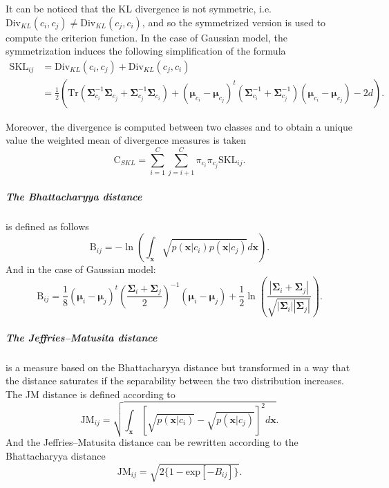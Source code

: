 \documentclass[a4paper,11pt,DIV=16,abstracton]{scrartcl}
\begin{document}
            It can be noticed that the KL divergence is not symmetric, i.e. $\text{Div}_{KL}(c_i,c_j) \ne \text{Div}_{KL}(c_j,c_i)$, and so the symmetrized version is used to compute the criterion function. In the case of Gaussian model, the symmetrization induces the following simplification of the formula
            \begin{align}
                \text{SKL}_{ij} &=\text{Div}_{KL}(c_i,c_j) + \text{Div}_{KL}(c_j,c_i) \nonumber \\
                &= \frac{1}{2} \left( \text{Tr} (\boldsymbol{\Sigma}_{c_i}^{-1} \boldsymbol{\Sigma}_{c_j} + \boldsymbol{\Sigma}_{c_j}^{-1} \boldsymbol{\Sigma}_{c_i}) + (\boldsymbol{\mu}_{c_i} - \boldsymbol{\mu}_{c_j})^t (\boldsymbol{\Sigma}_{c_i}^{-1} + \boldsymbol{\Sigma}_{c_j}^{-1}) (\boldsymbol{\mu}_{c_i} - \boldsymbol{\mu}_{c_j}) - 2d \right).
            \end{align}

            Moreover, the divergence is computed between two classes and to obtain a unique value the weighted mean of divergence measures is taken
            \begin{equation}
                \text{C}_{SKL} = \sum_{i=1}^{C} \sum_{j=i + 1}^{C} \pi_{c_i} \pi_{c_j} \text{SKL}_{ij}.
            \end{equation}

            \subparagraph{The Bhattacharyya distance} is defined as follows
            \begin{equation}
                \text{B}_{ij} = - \ln \left( \int_\mathbf{x} \sqrt{p(\mathbf{x}|c_i) p(\mathbf{x}|c_j)} d\mathbf{x} \right).
            \end{equation}
            And in the case of Gaussian model:
            \begin{equation}
                \text{B}_{ij} = \frac{1}{8} (\boldsymbol{\mu}_i - \boldsymbol{\mu}_j)^t \left( \frac{\boldsymbol{\Sigma}_i + \boldsymbol{\Sigma}_j}{2} \right)^{-1} (\boldsymbol{\mu}_i - \boldsymbol{\mu}_j) + \frac{1}{2} \ln \left( \frac{|\boldsymbol{\Sigma}_i + \boldsymbol{\Sigma}_j|}{\sqrt{|\boldsymbol{\Sigma}_i| |\boldsymbol{\Sigma}_j|}} \right).
            \end{equation}

            \subparagraph{The Jeffries–Matusita distance} is a measure based on the Bhattacharyya distance but transformed in a way that the distance saturates if the separability between the two distribution increases. The JM distance is defined according to
            \begin{equation}
                \text{JM}_{ij} = \sqrt{ \int_\mathbf{x} \left[\sqrt{p(\mathbf{x}|c_i)} - \sqrt{p(\mathbf{x}|c_j)}\right]^2 d\mathbf{x} }.
            \end{equation}
            And the Jeffries–Matusita distance can be rewritten according to the Bhattacharyya distance
            \begin{equation}
                \text{JM}_{ij} = \sqrt{ 2 \{1 - \text{exp}[-B_{ij}]\} }.
            \end{equation}
\end{document}
